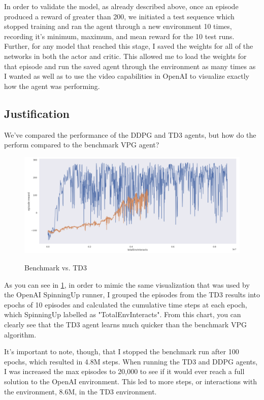 \documentclass{article}
\begin{document}
In order to validate the model, as already described above, once an episode produced a reward of greater than 200, we initiated a test sequence which stopped training and ran the agent through a new environment 10 times, recording it's minimum, maximum, and mean reward for the 10 test runs. Further, for any model that reached this stage, I saved the weights for all of the networks in both the actor and critic. This allowed me to load the weights for that episode and run the saved agent through the environment as many times as I wanted as well as to use the video capabilities in OpenAI to visualize exactly how the agent was performing. 


\subsection{Justification}
We've compared the performance of the DDPG and TD3 agents, but how do the perform compared to the benchmark VPG agent? 

\begin{figure}[h]
\caption{Benchmark vs. TD3}
\centering
\includegraphics[scale=0.4]{images/benchmark_v_td3.png}
\label{fig:benchmark_v_td3}
\end{figure}

As you can see in \ref{fig:benchmark_v_td3}, in order to mimic the same visualization that was used by the OpenAI SpinningUp runner, I grouped the episodes from the TD3 results into epochs of 10 episodes and calculated the cumulative time steps at each epoch, which SpinningUp labelled as "TotalEnvInteracts". From this chart, you can clearly see that the TD3 agent learns much quicker than the benchmark VPG algorithm. 

It's important to note, though, that I stopped the benchmark run after 100 epochs, which resulted in 4.8M steps. When running the TD3 and DDPG agents, I was increased the max episodes to 20,000 to see if it would ever reach a full solution to the OpenAI environment. This led to more steps, or interactions with the environment, 8.6M, in the TD3 environment. 
\end{document}
